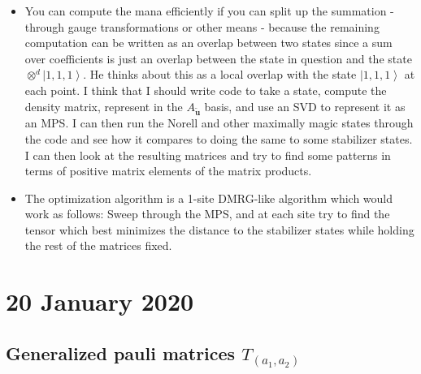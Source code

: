 \documentclass{report}
\begin{document}
\begin{itemize}
\begin{itemize}
 	\end{itemize}
 \item You can compute the mana efficiently if you can split up the summation - through gauge transformations or other means - because the remaining computation can be written as an overlap between two states since a sum over coefficients is just an overlap between the state in question and the state $\otimes^d \left |1,1,1\right>$. He thinks about this as a local overlap with the state $\left |1,1,1\right>$ at each point. I think that I should write code to take a state, compute the density matrix, represent in the $A_{\tilde{\bm u}}$ basis, and use an SVD to represent it as an MPS. I can then run the Norell and other maximally magic states through the code and see how it compares to doing the same to some stabilizer states. I can then look at the resulting matrices and try to find some patterns in terms of positive matrix elements of the matrix products. 
 \item The optimization algorithm is a 1-site DMRG-like algorithm which would work as follows: Sweep through the MPS, and at each site try to find the tensor which best minimizes the distance to the stabilizer states while holding the rest of the matrices fixed.
 \end{itemize}
 
 \chapter{20 January 2020}
 
 \section{Generalized pauli matrices $T_{(a_1,a_2)}$}
 
\end{document}
